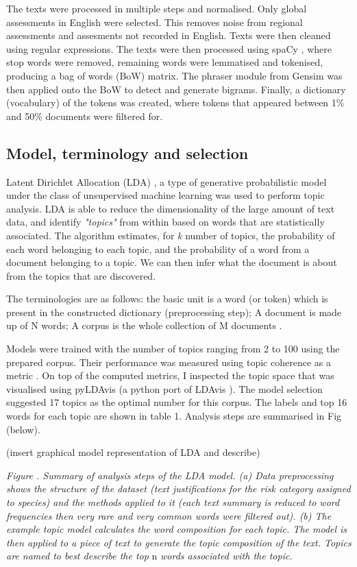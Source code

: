 The texts were processed in multiple steps and normalised. Only global assessments in English were selected. This removes noise from regional assessments and assesments not recorded in English. Texts were then cleaned using regular expressions. The texts were then processed using spaCy \parencite{spacy}, where stop words were removed, remaining words were lemmatised and tokenised, producing a bag of words (BoW) matrix. The phraser module from Gensim \parencite{rehurek_lrec} was then applied onto the BoW to detect and generate bigrams. Finally, a dictionary (vocabulary) of the tokens was created, where tokens that appeared between 1\% and 50\% documents were filtered for. 

\subsection{Model, terminology and selection}

Latent Dirichlet Allocation (LDA) \parencite{blei2003latent}, a type of generative probabilistic model under the class of unsupervised machine learning was used to perform topic analysis. LDA is able to reduce the dimensionality of the large amount of text data, and identify \textit{"topics"} from within based on words that are statistically associated. The algorithm estimates, for \textit{k} number of topics, the probability of each word belonging to each topic, and the probability of a word from a document belonging to a topic. We can then infer what the document is about from the topics that are discovered. 

The terminologies are as follows: the basic unit is a word (or token) which is present in the constructed dictionary (preprocessing step); A document is made up of N words; A corpus is the whole collection of M documents \parencite{blei2003latent}.

Models were trained with the number of topics ranging from 2 to 100 using the prepared corpus. Their performance was measured using topic coherence as a metric \parencite{roder2015exploring}. On top of the computed metrics, I inspected the topic space that was visualised using pyLDAvis (a python port of LDAvis \parencite{sievert2014ldavis}). The model selection suggested 17 topics as the optimal number for this corpus. The labels and top 16 words for each topic are shown in table 1. Analysis steps are summarised in Fig (below).

(insert graphical model representation of LDA and describe)

\textit{Figure . Summary of analysis steps of the LDA model. (a) Data preprocessing shows the structure of the dataset (text justifications for the risk category assigned to species) and the methods applied  to it (each text summary is reduced to word frequencies then very rare and very common words were filtered out). (b) The example topic model calculates the word composition for each topic. The model is then applied to a piece of text to generate the topic composition of the text. Topics are named to best describe the top} n \textit{words associated with the topic.}

